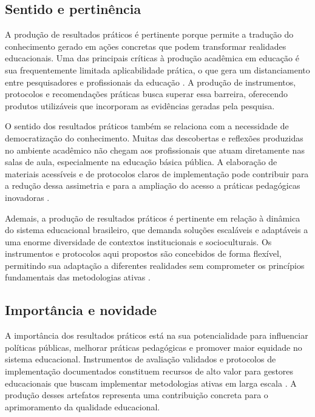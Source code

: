 \subsection{Sentido e pertinência}
\label{subsec:jpr_sentido}

A produção de resultados práticos é pertinente porque permite a tradução do conhecimento gerado em ações concretas que podem transformar realidades educacionais. Uma das principais críticas à produção acadêmica em educação é sua frequentemente limitada aplicabilidade prática, o que gera um distanciamento entre pesquisadores e profissionais da educação \cite{OLIVEIRA2023}. A produção de instrumentos, protocolos e recomendações práticas busca superar essa barreira, oferecendo produtos utilizáveis que incorporam as evidências geradas pela pesquisa.

O sentido dos resultados práticos também se relaciona com a necessidade de democratização do conhecimento. Muitas das descobertas e reflexões produzidas no ambiente acadêmico não chegam aos profissionais que atuam diretamente nas salas de aula, especialmente na educação básica pública. A elaboração de materiais acessíveis e de protocolos claros de implementação pode contribuir para a redução dessa assimetria e para a ampliação do acesso a práticas pedagógicas inovadoras \cite{MACHADO2025}.

Ademais, a produção de resultados práticos é pertinente em relação à dinâmica do sistema educacional brasileiro, que demanda soluções escaláveis e adaptáveis a uma enorme diversidade de contextos institucionais e socioculturais. Os instrumentos e protocolos aqui propostos são concebidos de forma flexível, permitindo sua adaptação a diferentes realidades sem comprometer os princípios fundamentais das metodologias ativas \cite{COSTA2020}.

\subsection{Importância e novidade}
\label{subsec:jpr_importancia}

A importância dos resultados práticos está na sua potencialidade para influenciar políticas públicas, melhorar práticas pedagógicas e promover maior equidade no sistema educacional. Instrumentos de avaliação validados e protocolos de implementação documentados constituem recursos de alto valor para gestores educacionais que buscam implementar metodologias ativas em larga escala \cite{BRASIL2018}. A produção desses artefatos representa uma contribuição concreta para o aprimoramento da qualidade educacional.

